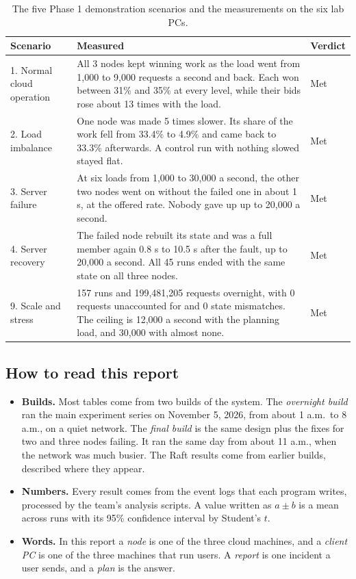 \begin{table}[!htb]
\centering\small
\caption{The five Phase 1 demonstration scenarios and the measurements on the six lab PCs.}
\label{tab:scenarios}
\begin{tabularx}{\linewidth}{@{}P{2.4cm}Lp{1.1cm}@{}}
\toprule
Scenario & Measured & Verdict \\
. Normal cloud operation & All 3 nodes kept winning work as the load went from 1,000 to 9,000 requests a second and back. Each won between 31\% and 35\% at every level, while their bids rose about 13 times with the load. & Met \\
2. Load imbalance & One node was made 5 times slower. Its share of the work fell from 33.4\% to 4.9\% and came back to 33.3\% afterwards. A control run with nothing slowed stayed flat. & Met \\
3. Server failure & At six loads from 1,000 to 30,000 a second, the other two nodes went on without the failed one in about 1 s, at the offered rate. Nobody gave up up to 20,000 a second. & Met \\
4. Server recovery & The failed node rebuilt its state and was a full member again 0.8 s to 10.5 s after the fault, up to 20,000 a second. All 45 runs ended with the same state on all three nodes. & Met \\
9. Scale and stress & 157 runs and 199,481,205 requests overnight, with 0 requests unaccounted for and 0 state mismatches. The ceiling is 12,000 a second with the planning load, and 30,000 with almost none. & Met \\
\bottomrule
\end{tabularx}
\end{table}

\subsection{How to read this report}

\begin{itemize}
  \item \textbf{Builds.} Most tables come from two builds of the system. The \emph{overnight build} ran the main experiment series on November 5, 2026, from about 1 a.m.\ to 8 a.m., on a quiet network. The \emph{final build} is the same design plus the fixes for two and three nodes failing. It ran the same day from about 11 a.m., when the network was much busier. The Raft results come from earlier builds, described where they appear.
  \item \textbf{Numbers.} Every result comes from the event logs that each program writes, processed by the team's analysis scripts. A value written as $a \pm b$ is a mean across runs with its 95\% confidence interval by Student's $t$.
  \item \textbf{Words.} In this report a \emph{node} is one of the three cloud machines, and a \emph{client PC} is one of the three machines that run users. A \emph{report} is one incident a user sends, and a \emph{plan} is the answer.
\end{itemize}


